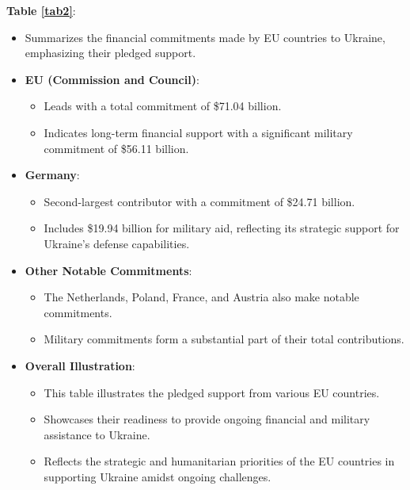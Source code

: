 \documentclass[12pt,preprint, authoryear]{elsarticle}
\numberwithin{equation}{section}
\numberwithin{figure}{section}
\numberwithin{table}{section}
\def\tightlist{} %
\begin{document}
\textbf{Table \ref{tab2}}:

\begin{itemize}
\item
  Summarizes the financial commitments made by EU countries to Ukraine,
  emphasizing their pledged support.
\item
  \textbf{EU (Commission and Council)}:

  \begin{itemize}
  \tightlist
  \item
    Leads with a total commitment of \$71.04 billion.
  \item
    Indicates long-term financial support with a significant military
    commitment of \$56.11 billion.
  \end{itemize}
\item
  \textbf{Germany}:

  \begin{itemize}
  \tightlist
  \item
    Second-largest contributor with a commitment of \$24.71 billion.
  \item
    Includes \$19.94 billion for military aid, reflecting its strategic
    support for Ukraine's defense capabilities.
  \end{itemize}
\item
  \textbf{Other Notable Commitments}:

  \begin{itemize}
  \tightlist
  \item
    The Netherlands, Poland, France, and Austria also make notable
    commitments.
  \item
    Military commitments form a substantial part of their total
    contributions.
  \end{itemize}
\item
  \textbf{Overall Illustration}:

  \begin{itemize}
  \tightlist
  \item
    This table illustrates the pledged support from various EU
    countries.
  \item
    Showcases their readiness to provide ongoing financial and military
    assistance to Ukraine.
  \item
    Reflects the strategic and humanitarian priorities of the EU
    countries in supporting Ukraine amidst ongoing challenges.
  \end{itemize}
\end{itemize}
\end{document}
